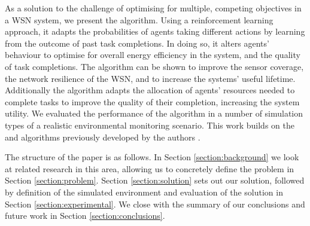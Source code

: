 As a solution to the challenge of optimising for multiple, competing objectives in a WSN system, we present the \acronymWSNOptimisationExtended{}{} algorithm. Using a reinforcement learning approach, it adapts the probabilities of agents taking different actions by learning from the outcome of past task completions. In doing so, it alters agents' behaviour to optimise for overall energy efficiency in the system, and the quality of task completions. The algorithm can be shown to improve the sensor coverage, the network resilience of the WSN, and to increase the systems' useful lifetime. Additionally the algorithm adapts the allocation of agents' resources needed to complete tasks to improve the quality of their completion, increasing the system utility.  We evaluated the performance of the  algorithm in a number of simulation types of a realistic environmental monitoring scenario. This work builds on the  \acronymATARIA{}{} and \acronymMGRAO{}{} algorithms previously developed by the authors  \citep{creech2021dynamic, creech2021resource}. 

The structure of the paper is as follows. In Section \ref{section:background} we look at related research in this area, allowing us to concretely define the problem in Section \ref{section:problem}. Section \ref{section:solution} sets out our solution, followed by definition of the simulated environment and evaluation of the solution in Section \ref{section:experimental}. We close with the summary of our conclusions and future work in Section \ref{section:conclusions}.
